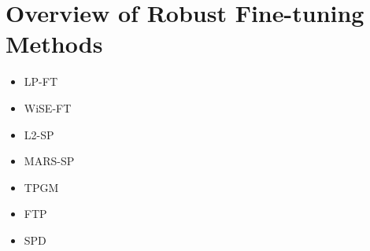 \section{Overview of Robust Fine-tuning Methods}

\begin{itemize}
    \item LP-FT~\citep{kumar_fine-tuning_2022}
    \item WiSE-FT~\citep{wortsman_robust_2022}
    \item L2-SP~\citep{li_explicit_2018}
    \item MARS-SP~\citep{gouk_distance-based_2021}
    \item TPGM~\citep{tian_trainable_2023}
    \item FTP~\citep{tian_fast_2023}
    \item SPD~\citep{tian_rethinking_2024}
\end{itemize}